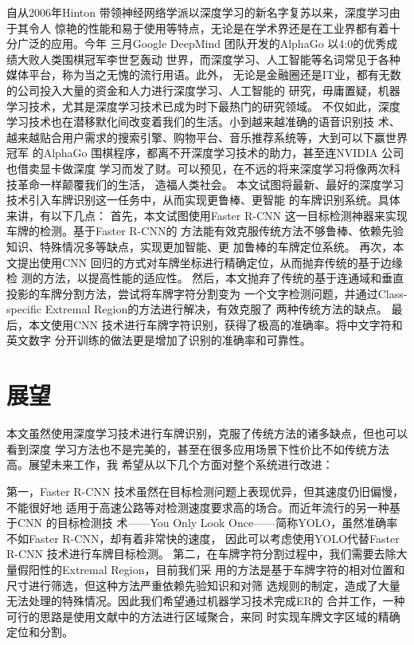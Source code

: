 自从2006年Hinton 带领神经网络学派以深度学习的新名字复苏以来，深度学习由于其令人
惊艳的性能和易于使用等特点，无论是在学术界还是在工业界都有着十分广泛的应用。今年
三月Google DeepMind 团队开发的AlphaGo 以4:0的优秀成绩大败人类围棋冠军李世乭轰动
世界，而深度学习、人工智能等名词常见于各种媒体平台，称为当之无愧的流行用语。此外，
无论是金融圈还是IT业，都有无数的公司投入大量的资金和人力进行深度学习、人工智能的
研究，毋庸置疑，机器学习技术，尤其是深度学习技术已成为时下最热门的研究领域。
不仅如此，深度学习技术也在潜移默化间改变着我们的生活。小到越来越准确的语音识别技
术、越来越贴合用户需求的搜索引擎、购物平台、音乐推荐系统等，大到可以下赢世界冠军
的AlphaGo 围棋程序，都离不开深度学习技术的助力，甚至连NVIDIA 公司也借卖显卡做深度
学习而发了财。可以预见，在不远的将来深度学习将像两次科技革命一样颠覆我们的生活，
造福人类社会。
本文试图将最新、最好的深度学习技术引入车牌识别这一任务中，从而实现更鲁棒、更智能
的车牌识别系统。具体来讲，有以下几点：
首先，本文试图使用Faster R-CNN 这一目标检测神器来实现车牌的检测。基于Faster R-CNN的
方法能有效克服传统方法不够鲁棒、依赖先验知识、特殊情况多等缺点，实现更加智能、更
加鲁棒的车牌定位系统。
再次，本文提出使用CNN 回归的方式对车牌坐标进行精确定位，从而抛弃传统的基于边缘检
测的方法，以提高性能的适应性。
然后，本文抛弃了传统的基于连通域和垂直投影的车牌分割方法，尝试将车牌字符分割变为
一个文字检测问题，并通过Class-specific Extremal Region的方法进行解决，有效克服了
两种传统方法的缺点。
最后，本文使用CNN 技术进行车牌字符识别，获得了极高的准确率。将中文字符和英文数字
分开训练的做法更是增加了识别的准确率和可靠性。

\section{展望}

本文虽然使用深度学习技术进行车牌识别，克服了传统方法的诸多缺点，但也可以看到深度
学习方法也不是完美的，甚至在很多应用场景下性价比不如传统方法高。展望未来工作，我
希望从以下几个方面对整个系统进行改进：

第一，Faster R-CNN 技术虽然在目标检测问题上表现优异，但其速度仍旧偏慢，不能很好地
适用于高速公路等对检测速度要求高的场合。而近年流行的另一种基于CNN 的目标检测技
术——You Only Look Once——简称YOLO，虽然准确率不如Faster R-CNN，却有着非常快的速度，
因此可以考虑使用YOLO代替Faster R-CNN 技术进行车牌目标检测。
第二，在车牌字符分割过程中，我们需要去除大量假阳性的Extremal Region，目前我们采
用的方法是基于车牌字符的相对位置和尺寸进行筛选，但这种方法严重依赖先验知识和对筛
选规则的制定，造成了大量无法处理的特殊情况。因此我们希望通过机器学习技术完成ER的
合并工作，一种可行的思路是使用文献\cite{Gomez:2014vp}中的方法进行区域聚合，来同
时实现车牌文字区域的精确定位和分割。